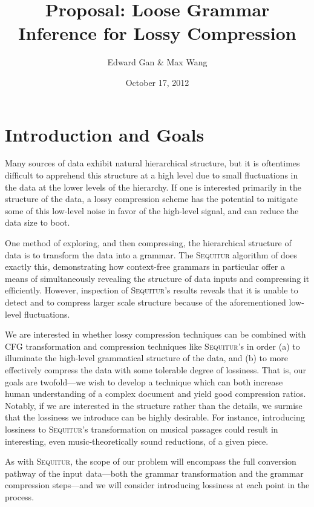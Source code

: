\documentclass[11pt]{article}
\newcommand{\Sequitur}{\textsc{Sequitur}\xspace}
\begin{document}


\title{Proposal: Loose Grammar Inference for Lossy Compression}
\author{Edward Gan \& Max Wang}
\date{October 17, 2012}
\maketitle

\section{Introduction and Goals}

Many sources of data exhibit natural hierarchical structure, but it is
oftentimes difficult to apprehend this structure at a high level due to small
fluctuations in the data at the lower levels of the hierarchy.  If one is
interested primarily in the structure of the data, a lossy compression scheme
has the potential to mitigate some of this low-level noise in favor of the
high-level signal, and can reduce the data size to boot.

One method of exploring, and then compressing, the hierarchical structure of
data is to transform the data into a grammar.  The \Sequitur algorithm of
\cite{sequitur} does exactly this, demonstrating how context-free grammars in
particular offer a means of simultaneously revealing the structure of data
inputs and compressing it efficiently.  However, inspection of \Sequitur's
results reveals that it is unable to detect and to compress larger scale
structure because of the aforementioned low-level fluctuations.

We are interested in whether lossy compression techniques can be combined with
CFG transformation and compression techniques like \Sequitur's in order (a) to
illuminate the high-level grammatical structure of the data, and (b) to more
effectively compress the data with some tolerable degree of lossiness.  That
is, our goals are twofold---we wish to develop a technique which can both
increase human understanding of a complex document and yield good compression
ratios.  Notably, if we are interested in the structure rather than the
details, we surmise that the lossiness we introduce can be highly desirable.
For instance, introducing lossiness to \Sequitur's transformation on musical
passages could result in interesting, even music-theoretically sound
reductions, of a given piece.

As with \Sequitur, the scope of our problem will encompass the full conversion
pathway of the input data---both the grammar transformation and the grammar
compression steps---and we will consider introducing lossiness at each point in
the process.
\end{document}
